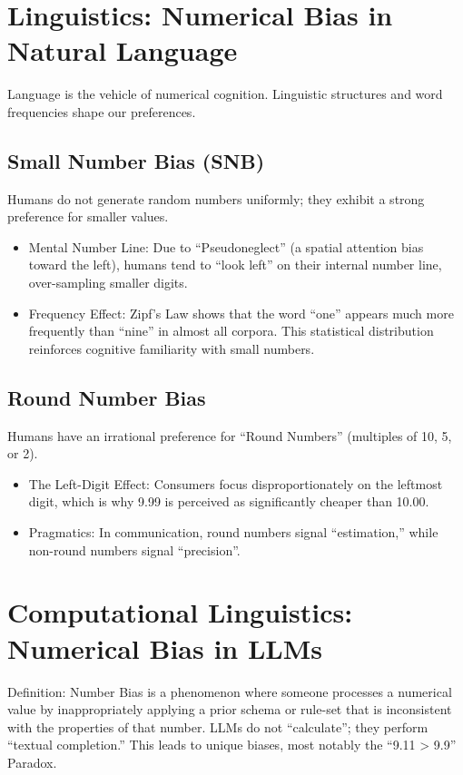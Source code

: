 \section{Linguistics: Numerical Bias in Natural Language}

Language is the vehicle of numerical cognition. Linguistic structures and word frequencies shape our preferences.

\subsection{Small Number Bias (SNB)}

Humans do not generate random numbers uniformly; they exhibit a strong preference for smaller values.
\begin{itemize}
    \item Mental Number Line: Due to “Pseudoneglect” (a spatial attention bias toward the left), humans tend to “look left” on their internal number line, over-sampling smaller digits\cite{loetscher2025}.
    \item Frequency Effect: Zipf’s Law shows that the word “one” appears much more frequently than “nine” in almost all corpora. This statistical distribution reinforces cognitive familiarity with small numbers\cite{jansen2025}.
\end{itemize}

\subsection{Round Number Bias}

Humans have an irrational preference for “Round Numbers” (multiples of 10, 5, or 2).
\begin{itemize}
    \item The Left-Digit Effect: Consumers focus disproportionately on the leftmost digit, which is why 9.99 is perceived as significantly cheaper than 10.00\cite{wikipedia2025}.
    \item Pragmatics: In communication, round numbers signal “estimation,” while non-round numbers signal “precision”\cite{pmcnih2025}.
\end{itemize}

\section{Computational Linguistics: Numerical Bias in LLMs}

Definition: Number Bias is a phenomenon where someone processes a numerical value by inappropriately applying a prior schema or rule-set that is inconsistent with the properties of that number. LLMs do not “calculate”; they perform “textual completion.” This leads to unique biases, most notably the “9.11 > 9.9” Paradox.

